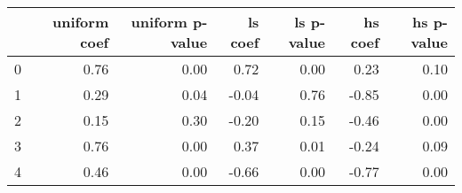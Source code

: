 \begin{tabular}{lrrrrrr}
\toprule
 & uniform coef & uniform p-value & ls coef & ls p-value & hs coef & hs p-value \\
\midrule
0 & 0.76 & 0.00 & 0.72 & 0.00 & 0.23 & 0.10 \\
1 & 0.29 & 0.04 & -0.04 & 0.76 & -0.85 & 0.00 \\
2 & 0.15 & 0.30 & -0.20 & 0.15 & -0.46 & 0.00 \\
3 & 0.76 & 0.00 & 0.37 & 0.01 & -0.24 & 0.09 \\
4 & 0.46 & 0.00 & -0.66 & 0.00 & -0.77 & 0.00 \\
\bottomrule
\end{tabular}
